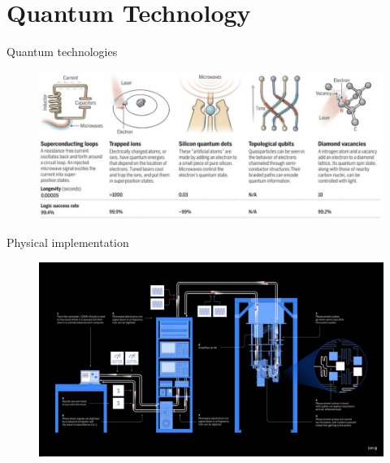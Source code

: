 \documentclass[11p,aspectratio=169]{beamer}
\begin{document}
\section{Quantum Technology}

\begin{frame}{Quantum technologies}
    \begin{figure}
        \includegraphics[width=\textwidth]{figures/q_technologies.jpg}
    \end{figure}
    
\end{frame}

\begin{frame}{Physical implementation}
    \begin{figure}
        \includegraphics[width=\textwidth]{figures/quantum_computer.jpeg}
    \end{figure}

\end{frame}
\end{document}

